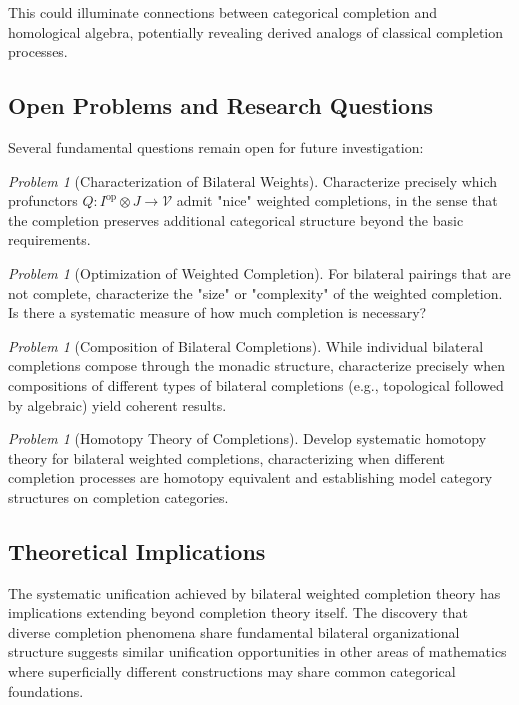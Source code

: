 \documentclass[11pt]{article}
\theoremstyle{plain}
\theoremstyle{definition}
\theoremstyle{remark}
\newtheorem{problem}[theorem]{Problem}
\newcommand{\V}{\mathcal{V}}
\newcommand{\op}{\mathrm{op}}
\begin{document}
This could illuminate connections between categorical completion and homological algebra, potentially revealing derived analogs of classical completion processes.

\subsection{Open Problems and Research Questions}

Several fundamental questions remain open for future investigation:

\begin{problem}[Characterization of Bilateral Weights]
Characterize precisely which profunctors $Q : I^{\op} \otimes J \to \V$ admit "nice" weighted completions, in the sense that the completion preserves additional categorical structure beyond the basic requirements.
\end{problem}

\begin{problem}[Optimization of Weighted Completion]
For bilateral pairings that are not complete, characterize the "size" or "complexity" of the weighted completion. Is there a systematic measure of how much completion is necessary?
\end{problem}

\begin{problem}[Composition of Bilateral Completions]
While individual bilateral completions compose through the monadic structure, characterize precisely when compositions of different types of bilateral completions (e.g., topological followed by algebraic) yield coherent results.
\end{problem}

\begin{problem}[Homotopy Theory of Completions]
Develop systematic homotopy theory for bilateral weighted completions, characterizing when different completion processes are homotopy equivalent and establishing model category structures on completion categories.
\end{problem}

\subsection{Theoretical Implications}

The systematic unification achieved by bilateral weighted completion theory has implications extending beyond completion theory itself. The discovery that diverse completion phenomena share fundamental bilateral organizational structure suggests similar unification opportunities in other areas of mathematics where superficially different constructions may share common categorical foundations.
\end{document}
